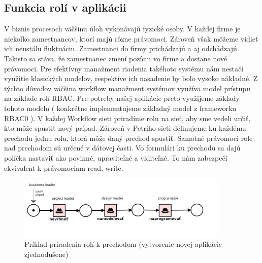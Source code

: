 

\subsection{Funkcia rolí v aplikácii}
V biznis procesoch väčšinu úloh vykonávajú fyzické osoby. V každej firme je niekoľko zamestnancov, ktorí majú rôzne právomoci. Zároveň však môžeme vidieť ich neustálu fluktuáciu. Zamestnanci do firmy prichádzajú a aj odchádzajú. Takisto sa stáva, že zamestnanec zmení pozíciu vo firme a dostane nové právomoci. Pre efektívny manažment riadenia takéhoto systému nám nestačí využitie klasických modelov, respektíve ich nasadenie by bolo vysoko nákladné. Z týchto dôvodov väčšina workflow manažment systémov využíva model  prístupu na základe rolí RBAC. Pre potreby našej aplikácie preto využijeme základy tohoto modelu ( konkrétne implementujeme základný model z frameworku RBAC0 \cite{sandhu96}). V každej Workflow sieti priradíme rolu na sieť, aby sme vedeli určiť, kto môže spustiť nový prípad. Zároveň v Petriho sieti definujeme ku každému prechodu jednu rolu, ktorá môže daný prechod spustiť. Samotné právomoci role nad prechodom sú určené v dátovej časti. Vo formulári ku prechodu sa dajú políčka nastaviť ako povinné, upraviteľné a viditeľné. To nám zabezpečí ekvivalent k právomociam read, write. 

\begin{figure}[h]
	\centerline{\includegraphics[width=0.9\textwidth]{images/vyvoj_role}}
	\caption[Príklad priradenia rolí k prechodom]{Príklad priradenia rolí k prechodom (vytvorenie novej aplikácie zjednodušene)}
	\label{obr:role_na prechody}
\end{figure}



